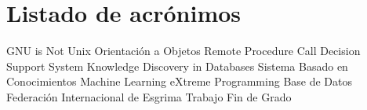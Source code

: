 \chapter{Listado de acrónimos}

{\small
\begin{acronym}[XXXXXXXX]
       {\acs{GNU} is Not Unix}
        {Orientación a Objetos}
       {Remote Procedure Call}
       {Decision Support System}
       {Knowledge Discovery in Databases}
       {Sistema Basado en Conocimientos}
        {Machine Learning}
        {eXtreme Programming}
      {Base de Datos}
       {Federación Internacional de Esgrima}
       {Trabajo Fin de Grado}
\end{acronym}
}




